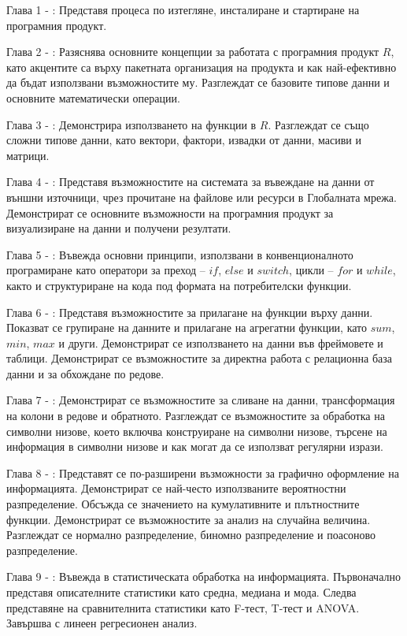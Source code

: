 Глава 1 - : Представя процеса по изтегляне, инсталиране и стартиране на програмния продукт.

Глава 2 - : Разяснява основните концепции за работата с програмния продукт $R$, като акцентите са върху пакетната организация на продукта и как най-ефективно да бъдат използвани възможностите му. Разглеждат се базовите типове данни и основните математически операции. 

Глава 3 - : Демонстрира използването на функции в $R$. Разглеждат се също сложни типове данни, като вектори, фактори, извадки от данни, масиви и матрици. 

Глава 4 - : Представя възможностите на системата за въвеждане на данни от външни източници, чрез прочитане на файлове или ресурси в Глобалната мрежа. Демонстрират се основните възможности на програмния продукт за визуализиране на данни и получени резултати.  

Глава 5 - : Въвежда основни принципи, използвани в конвенционалното програмиране като оператори за преход – $if$, $else$ и $switch$, цикли – $for$ и $while$, както и структуриране на кода под формата на потребителски функции.

Глава 6 - : Представя възможностите за прилагане на функции върху данни. Показват се групиране на данните и прилагане на агрегатни функции, като $sum$, $min$, $max$ и други. Демонстрират се използването на данни във фреймовете и таблици. Демонстрират се възможностите за директна работа с релационна база данни и за обхождане по редове.

Глава 7 - : Демонстрират се възможностите за сливане на данни, трансформация на колони в редове и обратното. Разглеждат се възможностите за обработка на символни низове, което включва конструиране на символни низове, търсене на информация в символни низове и как могат да се използват регулярни изрази. 

Глава 8 - : Представят се по-разширени възможности за графично оформление на информацията. Демонстрират се най-често използваните вероятностни разпределение. Обсъжда се значението на кумулативните и плътностните функции. Демонстрират се възможностите за анализ на случайна величина. Разглеждат се нормално разпределение, биномно разпределение и поасоново разпределение.

Глава 9 - : Въвежда в статистическата обработка на информацията. Първоначално представя описателните статистики като средна, медиана и мода. Следва представяне на сравнителнита статистики като F-тест, T-тест и ANOVA. Завършва с линеен регресионен анализ. 

